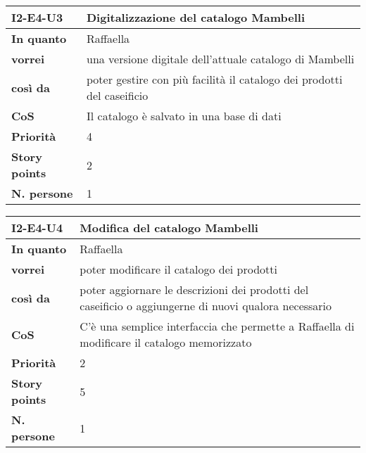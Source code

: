 \begin{table}[H]
  \begin{tabularx}{\textwidth}{lX}
    \toprule
    \textbf{I2-E4-U3} & \textbf{Digitalizzazione del catalogo Mambelli} \\
    \midrule
    \textbf{In quanto} & Raffaella \\
    \textbf{vorrei} & una versione digitale dell'attuale catalogo di Mambelli \\
    \textbf{così da} & poter gestire con più facilità il catalogo dei prodotti del caseificio \\
    \midrule
    \textbf{CoS} & Il catalogo è salvato in una base di dati \\
    \midrule
    \textbf{Priorità} & 4 \\
    \textbf{Story points} & 2 \\
    \textbf{N. persone} & 1 \\
    \bottomrule
  \end{tabularx}
  \label{user-story:i2-e4-u3}
\end{table}

\begin{table}[H]
  \begin{tabularx}{\textwidth}{lX}
    \toprule
    \textbf{I2-E4-U4} & \textbf{Modifica del catalogo Mambelli} \\
    \midrule
    \textbf{In quanto} & Raffaella \\
    \textbf{vorrei} & poter modificare il catalogo dei prodotti \\
    \textbf{così da} & poter aggiornare le descrizioni dei prodotti del caseificio o aggiungerne di nuovi qualora necessario \\
    \midrule
    \textbf{CoS} & C'è una semplice interfaccia che permette a Raffaella di modificare il catalogo memorizzato \\
    \midrule
    \textbf{Priorità} & 2 \\
    \textbf{Story points} & 5 \\
    \textbf{N. persone} & 1 \\
    \bottomrule
  \end{tabularx}
  \label{user-story:i2-e4-u4}
\end{table}


